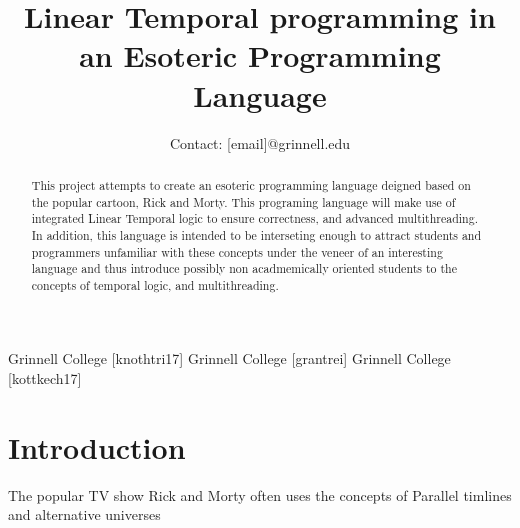 \documentclass[numbers]{sigplanconf}
\begin{document}
\setlength{\pdfpageheight}{\paperheight}
\setlength{\pdfpagewidth}{\paperwidth}



\titlebanner{}        %
\preprintfooter{}   %

\title{Linear Temporal programming in an Esoteric Programming Language}
\subtitle{Contact: [email]@grinnell.edu}


           {Grinnell College}
           {[knothtri17]}
           {Grinnell College}
           {[grantrei]}
           {Grinnell College}
           {[kottkech17]}

\makeatletter
\def\@copyrightspace{\relax}
\makeatother
%

\maketitle

\begin{abstract}
This project attempts to create an esoteric programming language
deigned based on the popular cartoon, Rick and Morty. This programing
language will make use of integrated Linear Temporal logic to ensure
correctness, and advanced multithreading. In addition, this language
is intended to be interseting enough to attract students and
programmers unfamiliar with these concepts under the veneer of an
interesting language and thus introduce possibly non acadmemically oriented students
 to the concepts of temporal logic, and multithreading.
\end{abstract}



\section{Introduction}
The popular TV show Rick and Morty often uses the concepts of
Parallel timlines and alternative universes
\end{document}
